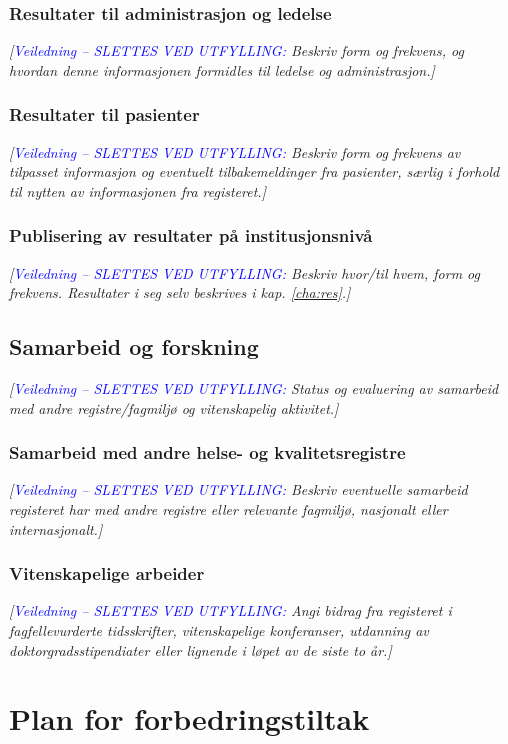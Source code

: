 \documentclass[norsk, a4paper, twocolumn]{report}
\newcommand{\newtext}[1]{\cbstart\textcolor{blue}{#1\cbend}}
\newcommand{\guide}[1] {
	\textit{[\textcolor{guidegray}{\newtext{Veiledning -- SLETTES VED UTFYLLING:} #1}]}
	}
\begin{document}
\section{Resultater til administrasjon og ledelse}\label{sec:resled}
\guide{Beskriv form og frekvens, og hvordan denne
informasjonen formidles til ledelse og administrasjon.}

\section{Resultater til pasienter}\label{sec:respas}
\guide{Beskriv form og frekvens av tilpasset informasjon og eventuelt
tilbakemeldinger fra pasienter, særlig i forhold til nytten av informasjonen
fra registeret.}

\section{Publisering av resultater på institusjonsnivå}\label{sec:off}
\guide{Beskriv hvor/til hvem, form og frekvens. Resultater i seg selv beskrives i kap. \ref{cha:res}.}




\chapter{Samarbeid og forskning}\label{cha:for}
\guide{Status og evaluering av samarbeid med andre registre/fagmiljø og  vitenskapelig aktivitet.}

\section{Samarbeid med andre helse- og kvalitetsregistre}\label{sec:samfag}
\guide{Beskriv eventuelle samarbeid registeret har med andre registre eller relevante fagmiljø, nasjonalt eller internasjonalt.}

\section{Vitenskapelige arbeider}\label{sec:vitarb}
\guide{Angi bidrag fra registeret i fagfellevurderte tidsskrifter,
vitenskapelige konferanser, utdanning av doktorgradsstipendiater eller
lignende i løpet av de siste to år.}




\onecolumn


\part{Plan for forbedringstiltak}\label{par:for}
\end{document}

